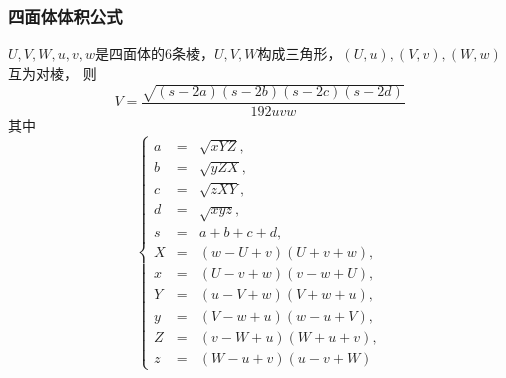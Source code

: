 \subsubsection{四面体体积公式}
$U, V, W, u, v, w$是四面体的$6$条棱，$U, V, W$构成三角形，$(U, u), (V, v), (W, w)$互为对棱，
则$$V = \frac{\sqrt{(s - 2a)(s - 2b)(s - 2c)(s - 2d)}}{192 uvw}$$
其中$$\left\{\begin{array}{lll}
a & = & \sqrt{xYZ}, \\
b & = & \sqrt{yZX}, \\
c & = & \sqrt{zXY}, \\
d & = & \sqrt{xyz}, \\
s & = & a + b + c + d, \\
X & = & (w - U + v)(U + v + w), \\
x & = & (U - v + w)(v - w + U), \\
Y & = & (u - V + w)(V + w + u), \\
y & = & (V - w + u)(w - u + V), \\
Z & = & (v - W + u)(W + u + v), \\
z & = & (W - u + v)(u - v + W)
\end{array}\right.$$
